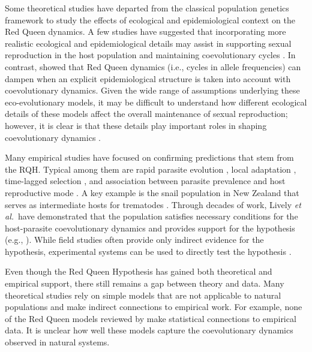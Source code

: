 \documentclass{article}\usepackage[]{graphicx}\usepackage[]{color}
\newcommand{\etal}{\textit{et al.}}
\begin{document}
Some theoretical studies have departed from the classical population genetics framework to study the effects of ecological and epidemiological context on the Red Queen dynamics.
A few studies have suggested that incorporating more realistic ecological and epidemiological details may assist in supporting sexual reproduction in the host population \citep{lively2009maintenance, lively2010epidemiological} and maintaining coevolutionary cycles \citep{ashby2014parasitic}.
In contrast, \cite{macpherson2018joint} showed that Red Queen dynamics (i.e., cycles in allele frequencies) can dampen when an explicit epidemiological structure is taken into account with coevolutionary dynamics.
Given the wide range of assumptions underlying these eco-evolutionary models, it may be difficult to understand how different ecological details of these models affect the overall maintenance of sexual reproduction;
however, it is clear is that these details play important roles in shaping coevolutionary dynamics \citep{song2015host, haafke2016eco, ashby2019understanding}.

Many empirical studies have focused on confirming predictions that stem from the RQH.
Typical among them are rapid parasite evolution \citep{rauch2006one}, local adaptation \citep{lively1989adaptation, morran2014experimental, king2009geographic, king2011coevolutionary, gibson2016within}, time-lagged selection \citep{buckling2002antagonistic, decaestecker2007host, koskella2009evidence, thrall2012rapid, koskella2013phage, koskella2014bacteria}, and association between parasite prevalence and host reproductive mode \citep{lively1992parthenogenesis, vergara2013geographic, verhoeven2013geographic}. 
A key example is the snail population in New Zealand that serves as intermediate hosts for trematodes \citep{winterbourn1974larval, mcarthur1976suppression}.
Through decades of work, Lively \etal\ have demonstrated that the population satisfies necessary conditions for the host-parasite coevolutionary dynamics and provides support for the hypothesis (e.g., \cite{lively1987evidence, lively1989adaptation, dybdahl1995host, dybdahl1998host, jokela2009maintenance, vergara2014infection, gibson2016within}).
While field studies often provide only indirect evidence for the hypothesis, 
experimental systems can be used to directly test the hypothesis \citep{morran2011running, auld2016sex, slowinski2016coevolutionary, lynch2018turnover, zilio2018effect}.

Even though the Red Queen Hypothesis has gained both theoretical and empirical support, there still remains a gap between theory and data.
Many theoretical studies rely on simple models that are not applicable to natural populations and make indirect connections to empirical work.
For example, none of the Red Queen models reviewed by \cite{ashby2015diversity} make statistical connections to empirical data.
It is unclear how well these models capture the coevolutionary dynamics observed in natural systems.
\end{document}
